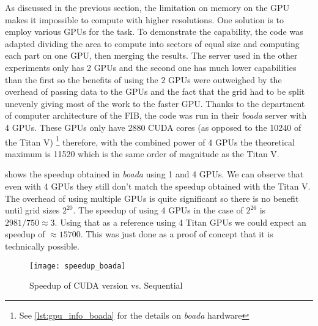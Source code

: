 As discussed in the previous section, the limitation on memory on the GPU makes
it impossible to compute with higher resolutions. One solution is to employ
various GPUs for the task. To demonstrate the capability, the code was adapted
dividing the area to compute into sectors of equal size and computing each part
on one GPU, then merging the results. The server used in the other experiments
only has 2 GPUs and the second one has much lower capabilities than the first so
the benefits of using the 2 GPUs were outweighed by the overhead of passing
data to the GPUs and the fact that the grid had to be split unevenly giving most
of the work to the faster GPU. Thanks to the department of computer architecture of
the FIB, the code was run in their \emph{boada} server with 4 GPUs. These GPUs only
have 2880 CUDA cores (as opposed to the 10240 of the Titan V) \footnote{See \cref{lst:gpu_info_boada} for the details on \emph{boada} hardware}
therefore, with the combined
power of 4 GPUs the theoretical maximum is 11520 which is the same order of magnitude
as the Titan V.

 shows the speedup obtained in \emph{boada} using 1 and 4 GPUs.
We can observe that even with 4 GPUs they still don't match the speedup obtained with
the Titan V. The overhead of using multiple GPUs is quite significant so there is no
benefit until grid sizes $2^{20}$. The speedup of using 4 GPUs in the case of
$2^{26}$ is $2981/750 \approx 3$. Using that as a reference using 4 Titan GPUs we could
expect an speedup of $\approx 15700$. This was just done as a proof of concept that
it is technically possible.

\begin{figure}[H]
    \centering
    \texttt{[image: speedup\_boada]}
    \caption{Speedup of CUDA version vs. Sequential}%
    \label{fig:speedup_boada}
\end{figure}


